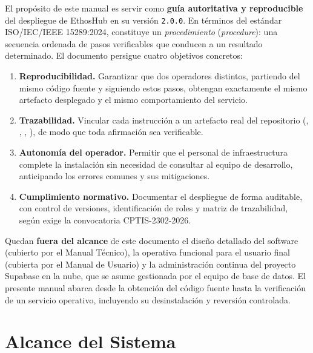 El propósito de este manual es servir como \textbf{guía autoritativa y reproducible}
del despliegue de EthosHub en su versión \texttt{2.0.0}. En términos del estándar
ISO/IEC/IEEE 15289:2024, constituye un \textit{procedimiento} (\textit{procedure}):
una secuencia ordenada de pasos verificables que conducen a un resultado determinado.
El documento persigue cuatro objetivos concretos:\par

\begin{enumerate}[noitemsep]
    \item \textbf{Reproducibilidad.} Garantizar que dos operadores distintos, partiendo
    del mismo código fuente y siguiendo estos pasos, obtengan exactamente el mismo
    artefacto desplegado y el mismo comportamiento del servicio.
    \item \textbf{Trazabilidad.} Vincular cada instrucción a un artefacto real del
    repositorio (, , ,
    ), de modo que toda afirmación sea verificable.
    \item \textbf{Autonomía del operador.} Permitir que el personal de infraestructura
    complete la instalación sin necesidad de consultar al equipo de desarrollo,
    anticipando los errores comunes y sus mitigaciones.
    \item \textbf{Cumplimiento normativo.} Documentar el despliegue de forma auditable,
    con control de versiones, identificación de roles y matriz de trazabilidad, según
    exige la convocatoria CPTIS-2302-2026.
\end{enumerate}

Quedan \textbf{fuera del alcance} de este documento el diseño detallado del software
(cubierto por el Manual Técnico), la operativa funcional para el usuario final
(cubierta por el Manual de Usuario) y la administración continua del proyecto Supabase
en la nube, que se asume gestionada por el equipo de base de datos. El presente manual
abarca desde la obtención del código fuente hasta la verificación de un servicio
operativo, incluyendo su desinstalación y reversión controlada.\par

\section{Alcance del Sistema}%
\label{sec:alcance}

